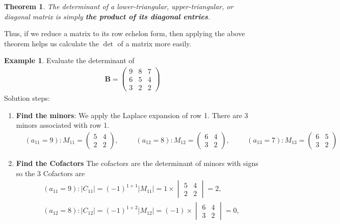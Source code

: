 \documentclass[10pt,a4paper]{book}
\newtheorem{theorem}{Theorem}[section]
\theoremstyle{definition}\newtheorem{definition}{Definition}
\theoremstyle{definition}\newtheorem{fact}{Fact}
\theoremstyle{definition}\newtheorem{ex}{Ex.}
\theoremstyle{definition}\newtheorem{project}{Project}
\theoremstyle{definition}\newtheorem{problem}{Problem}
\theoremstyle{definition}\newtheorem{example}{Example}
\numberwithin{theorem}{chapter}
\numberwithin{corollary}{chapter}
\numberwithin{assumption}{chapter}
\numberwithin{definition}{chapter}
\numberwithin{prop}{chapter}
\numberwithin{notation}{chapter}
\numberwithin{problem}{chapter}
\numberwithin{example}{chapter}
\numberwithin{fact}{chapter}
\numberwithin{ex}{chapter}
\newenvironment{ftheorem}
{\begin{mdframed}\begin{theorem}}
		{\end{theorem}\end{mdframed}}
\def\B{\mathbf B}
\begin{document}
	\begin{ftheorem}
		The determinant of a lower-triangular, upper-triangular, or diagonal matrix is simply \textbf{the product of its diagonal entries}.
	\end{ftheorem}
	
	Thus, if we reduce a matrix to its row echelon form, then applying the above theorem helps us calculate the $\det$ of a matrix more easily.
	
		
	\begin{example}
		Evaluate the determinant of 
		\begin{align*}
			\B = \begin{pmatrix}
				9 & 8 & 7 \\
				6 & 5 & 4 \\
				3 & 2 & 2
			\end{pmatrix}
		\end{align*}
		Solution steps:
		\begin{enumerate}
			\item \textbf{Find the minors}: We apply the Laplace expansion of row 1.
			There are 3 minors associated with row 1.
			\begin{align*}
				&(a_{11} = 9) : M_{11} = \begin{pmatrix}
					5 & 4 \\ 2 & 2
				\end{pmatrix}, & &
				&(a_{12} = 8) : M_{12} = \begin{pmatrix}
					6 & 4 \\ 3 & 2
				\end{pmatrix}, & &
				&(a_{13 }= 7) : M_{13} = \begin{pmatrix}
					6 & 5 \\ 3 & 2
				\end{pmatrix} 
			\end{align*}
			\item \textbf{Find the Cofactors} The cofactors are the determinant of minors with signs so the 3 Cofactors are
			\begin{align*}
				&(a_{11} = 9) : |C_{11}| = (-1)^{1+1} |M_{11}| = 1\times \begin{vmatrix}
					5 & 4 \\ 2 & 2
				\end{vmatrix} =  2, \\
				&(a_{12} = 8) : |C_{12}| = (-1)^{1+2} |M_{12}| = (-1) \times \begin{vmatrix}
					6 & 4 \\ 3 & 2
				\end{vmatrix} = 0, \\

\end{align*}
\end{enumerate}
\end{example}
\end{document}
